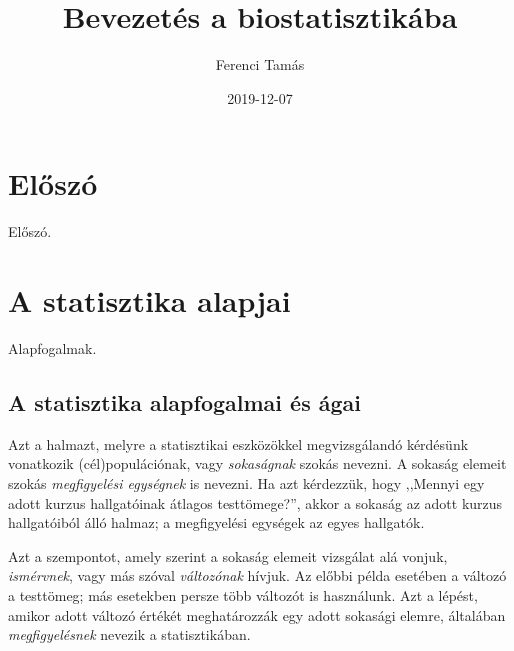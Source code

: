 \documentclass[
]{book}
\title{Bevezetés a biostatisztikába}
\author{Ferenci Tamás}
\date{2019-12-07}
\begin{document}
\frontmatter
\maketitle

{
\setcounter{tocdepth}{1}
\tableofcontents
}
\mainmatter
\hypertarget{elux151szuxf3}{%
\chapter{Előszó}\label{elux151szuxf3}}

Előszó.

\hypertarget{a-statisztika-alapjai}{%
\chapter{A statisztika alapjai}\label{a-statisztika-alapjai}}

Alapfogalmak.

\hypertarget{a-statisztika-alapfogalmai-uxe9s-uxe1gai}{%
\section{A statisztika alapfogalmai és ágai}\label{a-statisztika-alapfogalmai-uxe9s-uxe1gai}}

Azt a halmazt, melyre a statisztikai eszközökkel megvizsgálandó kérdésünk vonatkozik (cél)populációnak, vagy \emph{sokaságnak} szokás nevezni. A sokaság elemeit szokás \emph{megfigyelési egységnek} is nevezni. Ha azt kérdezzük, hogy ,,Mennyi egy adott kurzus hallgatóinak átlagos testtömege?'', akkor a sokaság az adott kurzus hallgatóiból álló halmaz; a megfigyelési egységek az egyes hallgatók.

Azt a szempontot, amely szerint a sokaság elemeit vizsgálat alá vonjuk, \emph{ismérvnek}, vagy más szóval \emph{változónak} hívjuk. Az előbbi példa esetében a változó a testtömeg; más esetekben persze több változót is használunk. Azt a lépést, amikor adott változó értékét meghatározzák egy adott sokasági elemre, általában \emph{megfigyelésnek} nevezik a statisztikában.
\end{document}
